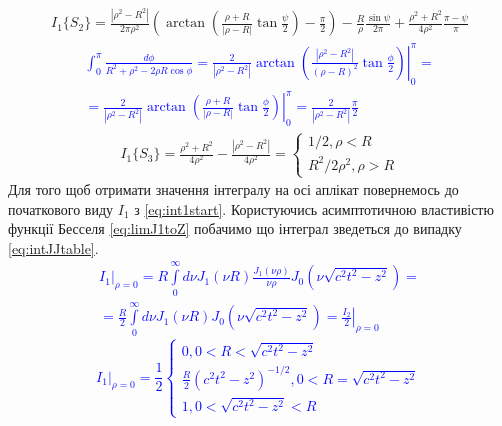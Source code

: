 %
\begin{equation*} \begin{aligned}
I_1 \{ S_2 \} = \frac{ | \rho^2 - R^2 | }{2 \pi \rho^2} \left(
\arctan \left( \frac{\rho + R}{ | \rho - R | } \tan \frac{\psi}{2} \right) -  
\frac{\pi}{2} \right) - \frac{R}{\rho} \frac{\sin \psi}{2 \pi} + 
\frac{\rho^2 + R^2}{4 \rho^2} \frac{\pi - \psi}{\pi}
\end{aligned} \end{equation*}
%
\textcolor{blue}{ \begin{equation*} \begin{aligned}
\int_{0}^{\pi} \frac{d \phi}{R^2 + \rho^2 - 2 \rho R \cos \phi} =
\left. \frac{2}{ | \rho^2 - R^2 | } \arctan \left( \frac{ | \rho^2 - R^2 | }
{\left( \rho - R \right)^2} \tan \frac{\phi}{2} \right)
\right|_{0}^{\pi} = \\ = \frac{2}{ | \rho^2 - R^2 | } \left.
\arctan \left( \frac{\rho + R}{ | \rho - R | } \tan \frac{\phi}{2} \right)
\right|_{0}^{\pi} = \frac{2}{ | \rho^2 - R^2 | } \frac{\pi}{2}
\end{aligned} \end{equation*} }
%
\begin{equation*} \begin{aligned}
I_1 \{ S_3 \} = \frac{\rho^2 + R^2}{4 \rho^2} - 
\frac{ |\rho^2 - R^2| }{4 \rho^2} = \begin{cases}
1/2 , \rho < R \\
R^2 / 2 \rho^2, \rho > R
\end{cases}
\end{aligned} \end{equation*}
%
Для того щоб отримати значення інтегралу на осі аплікат повернемось до 
початкового виду $ I_1 $ з \eqref{eq:int1start}. Користуючись асимптотичною 
властивістю функції Бесселя \eqref{eq:limJ1toZ} побачимо що інтеграл 
зведеться до випадку \eqref{eq:intJJtable}.
%
\textcolor{blue} {\begin{equation*} \begin{aligned}
\left. I_1 \right|_{\rho = 0} = R \int\limits_{0}^{\infty} d \nu
J_1 \left( \nu R \right) \frac{J_1 \left( \nu \rho \right) }{\nu \rho}
J_0 \left( \nu \sqrt{c^2 t^2 - z^2} \right) = \\
= \frac{R}{2} \int\limits_{0}^{\infty} d \nu
J_1 \left( \nu R \right) J_0 \left( \nu \sqrt{c^2 t^2 - z^2} \right) = 
\left. \frac{I_2}{2} \right|_{\rho = 0}
\end{aligned} \end{equation*} }
%
\textcolor{blue} {\begin{equation*}
\left. I_1 \right|_{\rho = 0} = \frac{1}{2} \begin{cases}
0, 0 < R < \sqrt{c^2t^2 - z^2} \\
\frac{R}{2} \left( c^2t^2 - z^2 \right)^{-1/2}, 0 < R = \sqrt{c^2t^2 - z^2} \\ 
1, 0 < \sqrt{c^2t^2 - z^2} < R 
\end{cases}
\end{equation*} }
